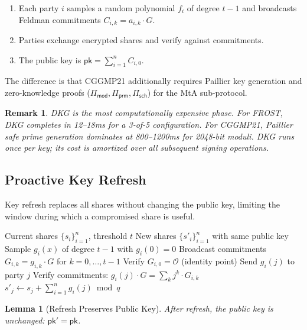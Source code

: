 \documentclass[11pt,twocolumn]{article}
\newtheorem{lemma}[theorem]{Lemma}
\newtheorem{remark}{Remark}[section]
\begin{document}
\begin{enumerate}[nosep]
  \item Each party $i$ samples a random polynomial $f_i$ of degree $t-1$ and broadcasts
    Feldman commitments $C_{i,k} = a_{i,k} \cdot G$.
  \item Parties exchange encrypted shares and verify against commitments.
  \item The public key is $\mathsf{pk} = \sum_{i=1}^n C_{i,0}$.
\end{enumerate}

The difference is that CGGMP21 additionally requires Paillier key generation and
zero-knowledge proofs ($\Pi_{\mathsf{mod}}, \Pi_{\mathsf{prm}}, \Pi_{\mathsf{sch}}$)
for the MtA sub-protocol.

\begin{remark}
DKG is the most computationally expensive phase. For FROST, DKG completes in 12--18ms
for a 3-of-5 configuration. For CGGMP21, Paillier safe prime generation dominates at
800--1200ms for 2048-bit moduli. DKG runs once per key; its cost is amortized over all
subsequent signing operations.
\end{remark}

\subsection{Proactive Key Refresh}
\label{sec:refresh}

Key refresh replaces all shares without changing the public key, limiting the window
during which a compromised share is useful.

\begin{algorithm}[H]
\caption{Proactive Key Refresh}
\label{alg:refresh}
\begin{algorithmic}[1]
\Require Current shares $\{s_i\}_{i=1}^n$, threshold $t$
\Ensure New shares $\{s'_i\}_{i=1}^n$ with same public key
  \State Sample $g_i(x)$ of degree $t-1$ with $g_i(0) = 0$
  \State Broadcast commitments $G_{i,k} = g_{i,k} \cdot G$ for $k = 0, \ldots, t-1$
  \State Verify $G_{i,0} = \mathcal{O}$ (identity point) 
  \State Send $g_i(j)$ to party $j$
\EndFor
{}
  \State Verify commitments: $g_i(j) \cdot G = \sum_k j^k \cdot G_{i,k}$
  \State $s'_j \gets s_j + \sum_{i=1}^n g_i(j) \bmod q$
\EndFor
\end{algorithmic}
\end{algorithm}

\begin{lemma}[Refresh Preserves Public Key]
\label{lem:refresh-pk}
After refresh, the public key is unchanged: $\mathsf{pk}' = \mathsf{pk}$.
\end{lemma}
\end{document}
